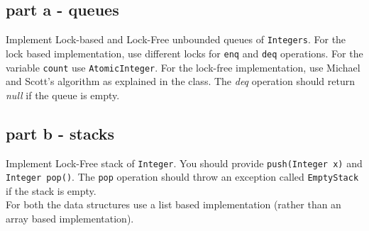 \documentclass{article}
\begin{document}
\subsection{part a - queues}
Implement Lock-based and Lock-Free unbounded queues of {\tt Integers}.
For the lock based implementation, use different locks for {\tt enq} and {\tt deq} operations.
For the variable {\tt count} use {\tt AtomicInteger}. 
For the lock-free implementation, 
use Michael and Scott's algorithm as
explained in the class. The {\em deq} operation should return {\em null}
if the queue is empty.\\

\subsection{part b - stacks}
Implement Lock-Free stack of {\tt Integer}. You should provide {\tt push(Integer x)}
and {\tt Integer pop()}. The {\tt pop} operation should throw an exception called
{\tt EmptyStack} if the stack is empty.
\\
For both the data structures use a list based implementation (rather than an array based implementation).
\end{document}
